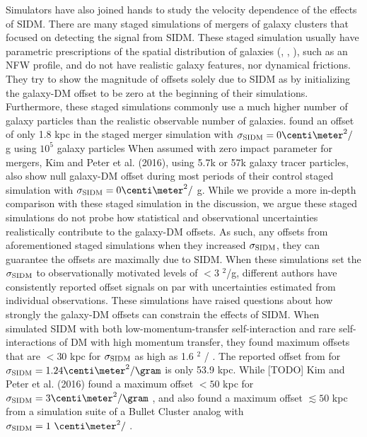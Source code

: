 Simulators have also joined hands to study the velocity dependence of the
effects of SIDM. There are many staged simulations of mergers of galaxy
clusters that focused on detecting the signal from
SIDM. These staged simulation usually have parametric prescriptions of the 
spatial distribution of galaxies  
(\citealt{Randall2008d}, \citealt{Kahlhoefer14}, \citealt{Robertson2016}), 
such as an NFW profile, 
and do not have realistic galaxy features, nor dynamical
frictions. 
They try to show the magnitude of offsets solely due to SIDM \citep{Kahlhoefer14} as 
by initializing the galaxy-DM offset to be zero at the beginning of their 
simulations. 
Furthermore, these staged simulations commonly use a much higher number of 
galaxy particles than the realistic observable number of galaxies. 
\cite{Randall2008d} found an offset of only 1.8 kpc in the staged merger
simulation with $\sigma_{\rm SIDM} = 0 \centi\meter^2 /$ g using $10^5$ 
galaxy particles 
When assumed with zero impact parameter for mergers, Kim and Peter et al.
(2016), using 5.7k or 57k galaxy tracer particles, also show 
null galaxy-DM offset during most periods of their control staged simulation 
with $\sigma_{\rm
SIDM} = 0 \centi\meter^2 /$ g. While we provide a more in-depth comparison with
these staged simulation in the discussion, we argue 
these staged simulations do not probe  
how statistical and observational uncertainties realistically contribute to 
the galaxy-DM offsets. 
As such, any offsets 
from aforementioned staged simulations when they increased $\sigma_{\rm
SIDM}$, they can guarantee the offsets are maximally due to SIDM.
When these simulations set the $\sigma_{\rm SIDM}$ to observationally motivated 
levels of $< 3$ \centi\meter$^2$/g, 
different authors have consistently reported offset signals  
on par with uncertainties estimated from individual observations. 
These simulations have raised questions about how strongly the galaxy-DM offsets 
can constrain the effects of SIDM.
When \cite{Kahlhoefer14} simulated SIDM with both low-momentum-transfer 
self-interaction 
and rare self-interactions of DM with high momentum transfer, they found maximum 
offsets that are $< 30$ kpc for $\sigma_{\rm SIDM}$ as high as 1.6
\centi\meter$^2$ / \gram.
The reported offset from \cite{Randall2008d}
for $\sigma_{\rm SIDM} = 1.24 \centi\meter^2 / \gram$ is only 53.9 kpc. 
While [TODO] Kim and Peter et al. (2016) found a maximum offset $< 50$ kpc for 
$\sigma_{\rm SIDM} = 3 \centi\meter^2 / \gram$ ,
and \cite{Robertson2016} also found a maximum offset $\lesssim 50$ kpc  
 from a simulation suite of a Bullet Cluster analog 
 with $\sigma_{\rm SIDM} = 1~\centi\meter^2 /$ \gram.

